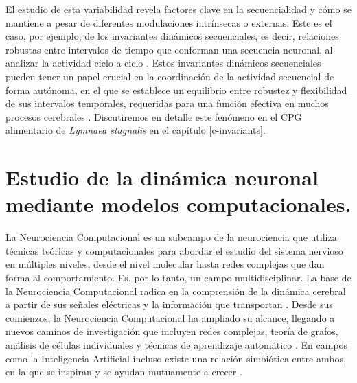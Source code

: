 El estudio de esta variabilidad revela factores clave en la secuencialidad y cómo se mantiene a pesar de diferentes modulaciones intrínsecas o externas. Este es el caso, por ejemplo, de los invariantes dinámicos secuenciales, es decir, relaciones robustas entre intervalos de tiempo que conforman una secuencia neuronal, al analizar la actividad ciclo a ciclo \parencite{reyes_artificial_2008,elices_robust_2019,garrido-pena_characterization_2021,berbel_emergence_2024}. Estos invariantes dinámicos secuenciales pueden tener un papel crucial en la coordinación de la actividad secuencial de forma autónoma, en el que se establece un equilibrio entre robustez y flexibilidad de sus intervalos temporales, requeridas para una función efectiva en muchos procesos cerebrales \parencite{tatsuno_analysis_2015,ullen_neural_2003,zimnik_independent_2021,zhou_neural_2020,dragoi_cell_2020}. Discutiremos en detalle este fenómeno en el CPG alimentario de \textit{Lymnaea stagnalis} en el capítulo \ref{c-invariants}.


\section{Estudio de la dinámica neuronal mediante modelos computacionales.}
\label{sec:computational neuroscience spanish}
La Neurociencia Computacional es un subcampo de la neurociencia que utiliza técnicas teóricas y computacionales para abordar el estudio del sistema nervioso en múltiples niveles, desde el nivel molecular hasta redes complejas que dan forma al comportamiento. Es, por lo tanto, un campo multidisciplinar. La base de la Neurociencia Computacional radica en la comprensión de la dinámica cerebral a partir de sus señales eléctricas y la información que transportan \parencite{schwiening_brief_2012,catterall_hodgkinhuxley_2012,dimitrov_information_2011,shannon_mathematical_1948}. Desde sus comienzos, la Neurociencia Computacional ha ampliado su alcance, llegando a nuevos caminos de investigación que incluyen redes complejas, teoría de grafos, análisis de células individuales y técnicas de aprendizaje automático \parencite{_30th_2021}. En campos como la Inteligencia Artificial incluso existe una relación simbiótica entre ambos, en la que se inspiran y se ayudan mutuamente a crecer \parencite{amunts_human_2019,wozniak_deep_2020,goncalves_training_2020}.


